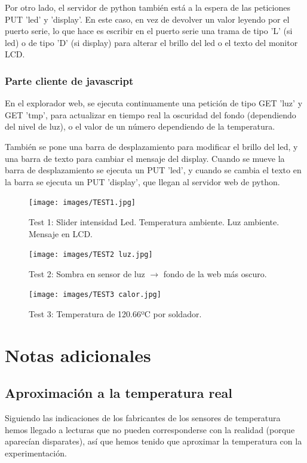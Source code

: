 \documentclass[]{article}
\begin{document}
\hfill

Por otro lado, el servidor de python también está a la espera de las peticiones PUT 'led' y 'display'. En este caso, en vez de devolver un valor leyendo por el puerto serie, lo que hace es escribir en el puerto serie una trama de tipo 'L' (si led) o de tipo 'D' (si display) para alterar el brillo del led o el texto del monitor LCD.

\subsubsection{Parte cliente de javascript}

En el explorador web, se ejecuta continuamente una petición de tipo GET 'luz' y GET 'tmp', para actualizar en tiempo real la oscuridad del fondo (dependiendo del nivel de luz), o el valor de un número dependiendo de la temperatura.

\hfill

También se pone una barra de desplazamiento para modificar el brillo del led, y una barra de texto para cambiar el mensaje del display. Cuando se mueve la barra de desplazamiento se ejecuta un PUT 'led', y cuando se cambia el texto en la barra se ejecuta un PUT 'display', que llegan al servidor web de python.




\begin{figure}[H]
	\centering
	\texttt{[image: images/TEST1.jpg]}
	\caption{Test 1: Slider intensidad Led. Temperatura ambiente. Luz ambiente. Mensaje en LCD.}
	\label{fig:test1}
\end{figure}

\begin{figure}[H]
	\centering
	\texttt{[image: images/TEST2 luz.jpg]}
	\caption{Test 2: Sombra en sensor de luz $\rightarrow$ fondo de la web más oscuro.}
	\label{fig:test2}
\end{figure}

\begin{figure}[H]
	\centering
	\texttt{[image: images/TEST3 calor.jpg]}
	\caption{Test 3: Temperatura de 120.66ºC por soldador.}
	\label{fig:test3}
\end{figure}

\section{Notas adicionales}

\subsection{Aproximación a la temperatura real}
Siguiendo las indicaciones de los fabricantes de los sensores de temperatura hemos llegado a lecturas que no pueden corresponderse con la realidad (porque aparecían disparates), así que hemos tenido que aproximar la temperatura con la experimentación.
\end{document}
